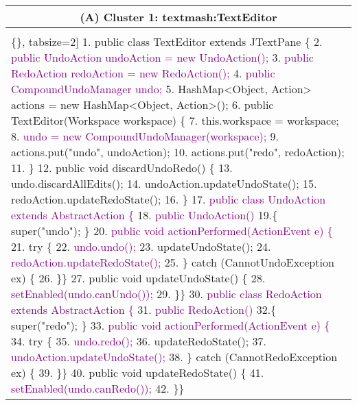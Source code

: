 


\begin{figure*}[!htb]
 \begin{minipage}{0.5\textwidth}
\scriptsize 
\begin{tabular}{@{}p{}} 
 \hline 
  \multicolumn{1}{c}{(A) Cluster 1: textmash:TextEditor} \\ \hline
  \vspace{-4mm}
\begin{Verbatim}[commandchars=\\\{\}, tabsize=2]
1. public class TextEditor extends JTextPane \{
2. \textcolor{purple}{ public UndoAction undoAction = new UndoAction();}
3. \textcolor{purple}{ public RedoAction redoAction = new RedoAction();}
4. \textcolor{purple}{ public CompoundUndoManager undo;}
5.  HashMap<Object, Action> actions = new HashMap<Object, Action>();
6.  public TextEditor(Workspace workspace) \{
7.    this.workspace = workspace;
8. \textcolor{purple}{   undo = new CompoundUndoManager(workspace);}
9.    actions.put("undo", undoAction);
10.   actions.put("redo", redoAction);
11.   \}
12. public void discardUndoRedo() \{
13.    undo.discardAllEdits();
14.    undoAction.updateUndoState();
15.    redoAction.updateRedoState();
16.   \}
17.\textcolor{purple}{ public class UndoAction extends AbstractAction \{}
18.\textcolor{purple}{   public UndoAction() }
19.\{     super("undo"); \}
20.\textcolor{purple}{  public void actionPerformed(ActionEvent e) \{}
21.   try \{
22.\textcolor{purple}{     undo.undo();}
23.     updateUndoState();
24.\textcolor{purple}{     redoAction.updateRedoState();}
25.    \} catch (CannotUndoException ex) \{
26.    \}\}
27. public void updateUndoState() \{
28.\textcolor{purple}{     setEnabled(undo.canUndo());}
29.   \}\}
30.\textcolor{purple}{ public class RedoAction extends AbstractAction \{}
31.\textcolor{purple}{   public RedoAction() }
32.\{     super("redo"); \}
33.\textcolor{purple}{   public void actionPerformed(ActionEvent e) \{}
34.    try \{
35.\textcolor{purple}{      undo.redo();}
36.      updateRedoState();
37.\textcolor{purple}{      undoAction.updateUndoState();}
38.     \} catch (CannotRedoException ex) \{
39.     \}\}
40.  public void updateRedoState() \{
41.\textcolor{purple}{      setEnabled(undo.canRedo());}
42.     \}\}
  \end{Verbatim}
      \vspace{-4mm}
     \\ 
\end{tabular} 
\end{minipage}

\end{figure*}
